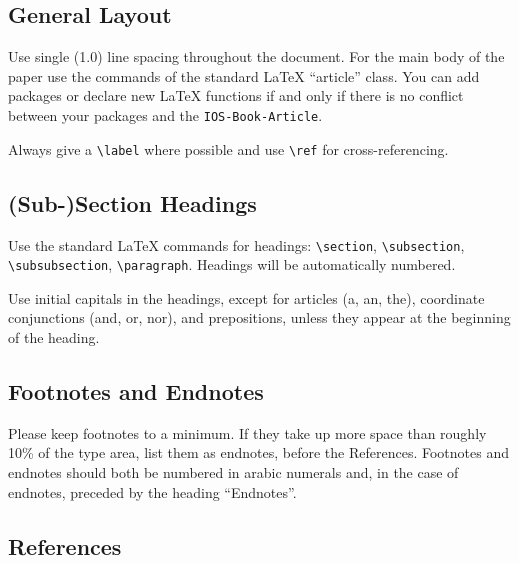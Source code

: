 \documentclass{Bigpool}
\begin{document}
\subsection{General Layout}
Use single (1.0) line spacing throughout the document. For the main
body of the paper use the commands of the standard \LaTeX{}
``article'' class. You can add packages or declare new \LaTeX{}
functions if and only if there is no conflict between your packages
and the \texttt{IOS-Book-Article}.

Always give a \verb|\label| where possible and use \verb|\ref| for cross-referencing.


\subsection{(Sub-)Section Headings}
Use the standard \LaTeX{} commands for headings: {\small \verb|\section|, \verb|\subsection|, \verb|\subsubsection|, \verb|\paragraph|}.
Headings will be automatically numbered.

Use initial capitals in the headings, except for articles (a, an, the), coordinate
conjunctions (and, or, nor), and prepositions, unless they appear at the beginning
of the heading.

\subsection{Footnotes and Endnotes}
Please keep footnotes to a minimum. If they take up more space than roughly 10\% of
the type area, list them as endnotes, before the References. Footnotes and endnotes
should both be numbered in arabic numerals and, in the case of endnotes, preceded by
the heading ``Endnotes''.

\subsection{References}
\end{document}
